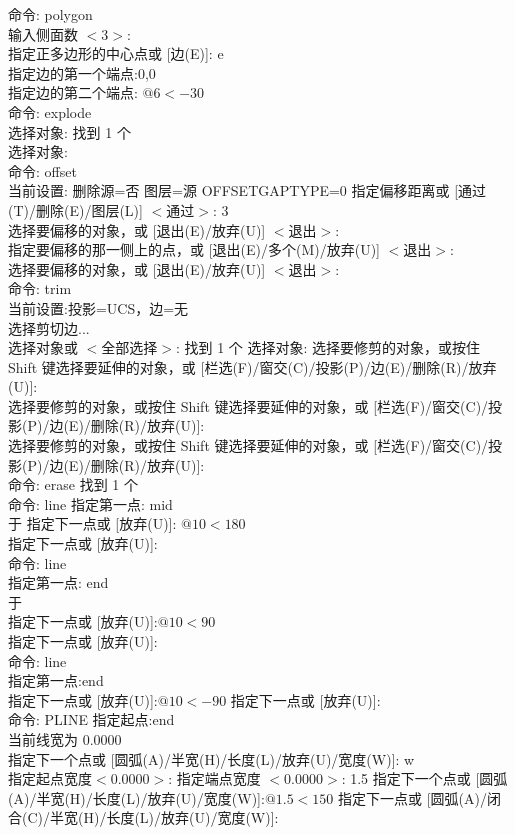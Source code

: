 \noindent
命令: polygon \\
输入侧面数 $<3>$:\\
指定正多边形的中心点或 [边(E)]: e\\
指定边的第一个端点:0,0\\
指定边的第二个端点: $@6<-30$\\
命令: explode\\
选择对象: 找到 1 个\\
选择对象:\\
命令: offset\\
当前设置: 删除源=否  图层=源  OFFSETGAPTYPE=0
指定偏移距离或 [通过(T)/删除(E)/图层(L)] $<$通过$>$: 3\\
选择要偏移的对象，或 [退出(E)/放弃(U)] $<$退出$>$:\\
指定要偏移的那一侧上的点，或 [退出(E)/多个(M)/放弃(U)] $<$退出$>$:\\
选择要偏移的对象，或 [退出(E)/放弃(U)] $<$退出$>$:\\
命令: trim\\
当前设置:投影=UCS，边=无\\
选择剪切边...\\
选择对象或 $<$全部选择$>$:  找到 1 个
选择对象:
选择要修剪的对象，或按住 Shift 键选择要延伸的对象，或
[栏选(F)/窗交(C)/投影(P)/边(E)/删除(R)/放弃(U)]:\\
选择要修剪的对象，或按住 Shift 键选择要延伸的对象，或
[栏选(F)/窗交(C)/投影(P)/边(E)/删除(R)/放弃(U)]:\\
选择要修剪的对象，或按住 Shift 键选择要延伸的对象，或
[栏选(F)/窗交(C)/投影(P)/边(E)/删除(R)/放弃(U)]:\\
命令: erase 找到 1 个\\
命令: line 指定第一点: mid\\
于
指定下一点或 [放弃(U)]: $@10<180$\\
指定下一点或 [放弃(U)]:\\
命令: line\\
指定第一点: end\\
于\\
指定下一点或 [放弃(U)]:$ @10<90$\\
指定下一点或 [放弃(U)]:\\
命令: line\\
指定第一点:end\\
指定下一点或 [放弃(U)]:$ @10<-90$
指定下一点或 [放弃(U)]:\\
命令: PLINE
指定起点:end\\
当前线宽为 0.0000\\
指定下一个点或 [圆弧(A)/半宽(H)/长度(L)/放弃(U)/宽度(W)]: w\\
指定起点宽度$ <$0.0000$>$:
指定端点宽度 $<$0.0000$>$: 1.5
指定下一个点或 [圆弧(A)/半宽(H)/长度(L)/放弃(U)/宽度(W)]:$ @1.5<150$
指定下一点或 [圆弧(A)/闭合(C)/半宽(H)/长度(L)/放弃(U)/宽度(W)]:\\

\endinput